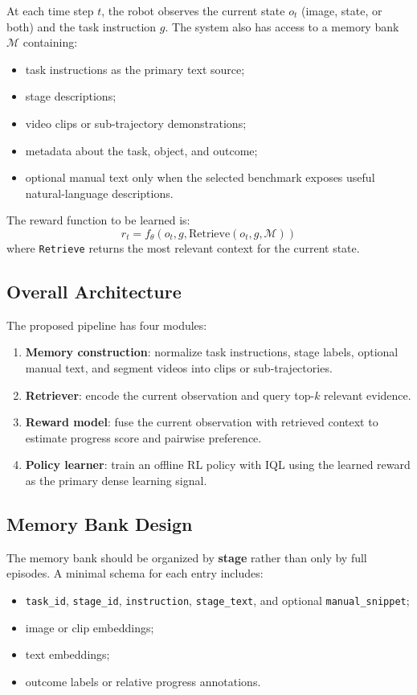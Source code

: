 At each time step $t$, the robot observes the current state $o_t$
(image, state, or both) and the task instruction $g$.
The system also has access to a memory bank $\mathcal{M}$ containing:
\begin{itemize}
  \item task instructions as the primary text source;
  \item stage descriptions;
  \item video clips or sub-trajectory demonstrations;
  \item metadata about the task, object, and outcome;
  \item optional manual text only when the selected benchmark exposes useful natural-language descriptions.
\end{itemize}

The reward function to be learned is:
\[
r_t = f_\theta(o_t, g, \text{Retrieve}(o_t, g, \mathcal{M}))
\]
where \texttt{Retrieve} returns the most relevant context for the current state.

\subsection{Overall Architecture}

The proposed pipeline has four modules:
\begin{enumerate}
  \item \textbf{Memory construction}: normalize task instructions, stage labels, optional manual text, and segment videos into clips or sub-trajectories.
  \item \textbf{Retriever}: encode the current observation and query top-$k$ relevant evidence.
  \item \textbf{Reward model}: fuse the current observation with retrieved context to estimate progress score and pairwise preference.
  \item \textbf{Policy learner}: train an offline RL policy with IQL using the learned reward as the primary dense learning signal.
\end{enumerate}

\subsection{Memory Bank Design}

The memory bank should be organized by \textbf{stage} rather than only by full episodes.
A minimal schema for each entry includes:
\begin{itemize}
  \item \texttt{task\_id}, \texttt{stage\_id}, \texttt{instruction}, \texttt{stage\_text}, and optional \texttt{manual\_snippet};
  \item image or clip embeddings;
  \item text embeddings;
  \item outcome labels or relative progress annotations.
\end{itemize}

